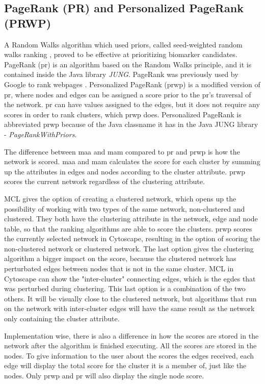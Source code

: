 \subsection{PageRank (PR) and Personalized PageRank (PRWP)} 
A Random Walks\cite{random-walks2} algorithm which used priors, called
seed-weighted random walks ranking \cite{sw-rwr}, proved to be effective at
prioritizing biomarker candidates. PageRank (\gls{pr}) is an algorithm based on
the Random Walks principle, and it is contained inside the Java library
\textit{JUNG}\cite{jung}. PageRank was previously used by Google to rank
webpages \cite{pagerank}. Personalized PageRank (\gls{prwp})\cite{pr-bio} is a
modified version of \gls{pr}, where nodes and edges can be assigned a score
prior to the \gls{pr}'s traversal of the network. \gls{pr} can have values
assigned to the edges, but it does not require any scores in order to rank
clusters, which \gls{prwp} does. Personalized PageRank is abbreviated \gls{prwp}
because of the Java classname it has in the Java JUNG library
- \textit{PageRankWithPriors}.

The difference between \gls{maa} and \gls{mam} compared to \gls{pr} and
\gls{prwp} is how the network is scored. \gls{maa} and \gls{mam} calculates the
score for each cluster by summing up the attributes in edges and nodes according
to the cluster attribute. \gls{prwp} scores the current network regardless of
the clustering attribute. 

MCL gives the option of creating a clustered network, which opens up the
possibility of working with two types of the same network, non-clustered and
clustered. They both have the clustering attribute in the network, edge and node
table, so that the ranking algorithms are able to score the clusters. \gls{prwp}
scores the currently selected network in Cytoscape, resulting in the option of
scoring the non-clustered network or clustered network. The last option gives
the clustering algorithm a bigger impact on the score, because the clustered
network has perturbated edges between nodes that is not in the same cluster. MCL
in Cytoscape can show the "inter-cluster" connecting edges, which is the egdes
that was perturbed during clustering. This last option is a combination of the
two others. It will be visually close to the clustered network, but algorithms
that run on the network with inter-cluster edges will have the same result as
the network only containing the cluster attribute.

Implementation wise, there is also a difference in how the scores are stored in
the network after the algorithm is finished executing. All the scores are stored
in the nodes. To give information to the user about the scores the edges
received, each edge will display the total score for the cluster it is a member
of, just like the nodes. Only \gls{prwp} and \gls{pr} will also display the
single node score.

